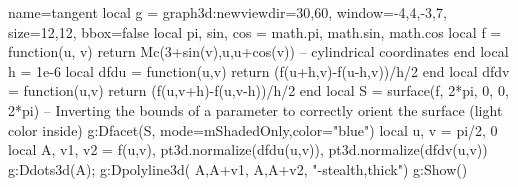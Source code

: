\documentclass[tikz,border=3.14mm]{standalone}
\begin{document}
    \begin{luadraw}{name=tangent}
        local g = graph3d:new{viewdir={30,60}, window={-4,4,-3,7}, size={12,12}, bbox=false}
        local pi, sin, cos = math.pi, math.sin, math.cos
        local f = function(u, v) 
            return Mc(3+sin(v),u,u+cos(v)) -- cylindrical coordinates
        end
        local h = 1e-6
        local dfdu = function(u,v) return (f(u+h,v)-f(u-h,v))/h/2 end
        local dfdv = function(u,v) return (f(u,v+h)-f(u,v-h))/h/2 end
        local S = surface(f, 2*pi, 0, 0, 2*pi)
        -- Inverting the bounds of a parameter to correctly orient the surface (light color inside)
        g:Dfacet(S, {mode=mShadedOnly,color="blue"})
        local u, v = pi/2, 0
        local A, v1, v2 = f(u,v), pt3d.normalize(dfdu(u,v)), pt3d.normalize(dfdv(u,v))
        g:Ddots3d(A); g:Dpolyline3d( {{A,A+v1}, {A,A+v2}}, "-stealth,thick")
        g:Show()
    \end{luadraw}
\end{document}
